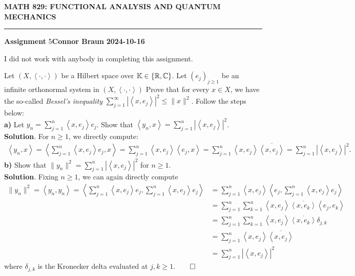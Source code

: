 \documentclass[10pt]{article}
\newcommand{\1}[1]{\mathbbm{1}_{#1}} \newcommand{\mc}[1]{\mathcal{#1}}
\newcommand{\ip}[2]{\left\langle#1,#2\right\rangle }
\begin{document}
    \begin{center}
        {\bf\large{MATH 829: FUNCTIONAL ANALYSIS AND QUANTUM MECHANICS}}
        \smallskip
        \hrule
        \smallskip
        {\bf Assignment} 5\hfill {\bf Connor Braun} \hfill {\bf 2024-10-16}
    \end{center}
    \vspace{5pt}
    \begin{center}
        \begin{minipage}{\dimexpr\paperwidth-10cm}
            I did not work with anybody in completing this assignment.
        \end{minipage}
    \end{center}
     Let $(X,\ip{\cdot}{\cdot})$ be a Hilbert space over $\mathbb{K}\in\{\mathbb{R},\mathbb{C}\}$. Let $(e_j)_{j\geq 1}$ be an infinite orthonormal
    system in $(X,\ip{\cdot}{\cdot})$ Prove that for every $x\in X$, we have the so-called {\it Bessel's inequality}
    $\sum_{j=1}^\infty|\ip{x}{e_j}|^2\leq\|x\|^2$. Follow the steps below:\\[5pt]
    {\bf a)} Let $y_n=\sum_{j=1}^n\ip{x}{e_j}e_j$. Show that $\ip{y_n}{x}=\sum_{j=1}^n|\ip{x}{e_j}|^2$.\\[5pt]
    {\bf Solution}. For $n\geq 1$, we directly compute: 
    \begin{align*}
        \ip{y_n}{x}=\ip{\sum_{j=1}^n\ip{x}{e_j}e_j}{x}=\sum_{j=1}^n\ip{x}{e_j}\ip{e_j}{x}=\sum_{j=1}^n\ip{x}{e_j}\overline{\ip{x}{e_j}}=\sum_{j=1}^n|\ip{x}{e_j}|^2.\tag*{$\qed$}
    \end{align*}
    {\bf b)} Show that $\|y_n\|^2=\sum_{j=1}^n|\ip{x}{e_j}|^2$ for $n\geq 1$.\\[5pt]
    {\bf Solution}. Fixing $n\geq 1$, we can again directly compute
    \begin{align*}
        \|y_n\|^2=\ip{y_n}{y_n}=\ip{\sum_{j=1}^n\ip{x}{e_j}e_j}{\sum_{j=1}^n\ip{x}{e_j}e_j}&=\sum_{j=1}^n\ip{x}{e_j}\ip{e_j}{\sum_{j=1}^n\ip{x}{e_j}e_j}\\
        &=\sum_{j=1}^n\sum_{k=1}^n\ip{x}{e_j}\overline{\ip{x}{e_k}}\ip{e_j}{e_k}\\
        &=\sum_{j=1}^n\sum_{k=1}^n\ip{x}{e_j}\overline{\ip{x}{e_k}}\delta_{j,k}\\
        &=\sum_{j=1}^n\ip{x}{e_j}\overline{\ip{x}{e_j}}\\
        &=\sum_{j=1}^n|\ip{x}{e_j}|^2
    \end{align*}
    where $\delta_{j,k}$ is the Kronecker delta evaluated at $j,k\geq 1$.\hfill{$\qed$}\\[5pt]
\end{document}
